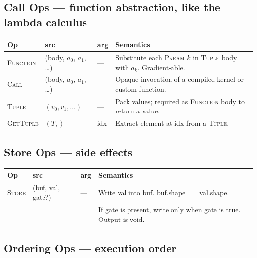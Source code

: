 \documentclass[10pt,letterpaper]{article}
\newcommand{\op}[1]{\textsc{#1}}
\begin{document}
\subsection*{{\color{callblue}Call Ops} \normalfont\small--- function abstraction, like the lambda calculus}

\begin{tabular}{@{}l l l l@{}}
\toprule
\textbf{Op} & \textbf{src} & \textbf{arg} & \textbf{Semantics} \\
\midrule
\op{Function} & (body, $a_0$, $a_1$, \ldots) & --- & Substitute each \op{Param} $k$ in \op{Tuple} body with $a_k$. Gradient-able. \\
\op{Call} & (body, $a_0$, $a_1$, \ldots) & --- & Opaque invocation of a compiled kernel or custom function. \\
\op{Tuple} & $(v_0, v_1, \ldots)$ & --- & Pack values; required as \op{Function} body to return a value. \\
\op{GetTuple} & $(T,)$ & idx & Extract element at idx from a \op{Tuple}. \\
\bottomrule
\end{tabular}

\subsection*{{\color{multipurple}Store Ops} \normalfont\small--- side effects}

\begin{tabular}{@{}l l l l@{}}
\toprule
\textbf{Op} & \textbf{src} & \textbf{arg} & \textbf{Semantics} \\
\midrule
\op{Store} & (buf, val, gate?) & --- & Write val into buf. buf.shape $=$ val.shape. \\
  & & & If gate is present, write only when gate is true. Output is void. \\
\bottomrule
\end{tabular}

\subsection*{{\color{assignbrown}Ordering Ops} \normalfont\small--- execution order}
\end{document}
